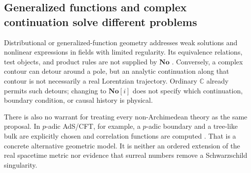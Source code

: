 \documentclass[11pt,a4paper]{article}
\numberwithin{equation}{section}
\theoremstyle{definition}
\theoremstyle{remark}
\newcommand{\C}{\mathbb C}
\newcommand{\No}{\mathbf{No}}
\begin{document}
\subsection{Generalized functions and complex continuation solve different problems}
Distributional or generalized-function geometry addresses weak solutions and
nonlinear expressions in fields with limited regularity. Its equivalence
relations, test objects, and product rules are not supplied by $\No$
\cite{SV}. Conversely, a complex contour can detour around a pole, but an
analytic continuation along that contour is not necessarily a real Lorentzian
trajectory. Ordinary $\C$ already permits such detours; changing to $\No[i]$
does not specify which continuation, boundary condition, or causal history is
physical.

There is also no warrant for treating every non-Archimedean theory as the same
proposal. In $p$-adic AdS/CFT, for example, a $p$-adic boundary and a tree-like
bulk are explicitly chosen and correlation functions are computed
\cite{Gubser}. That is a concrete alternative geometric model. It is neither
an ordered extension of the real spacetime metric nor evidence that surreal
numbers remove a Schwarzschild singularity.
\end{document}
